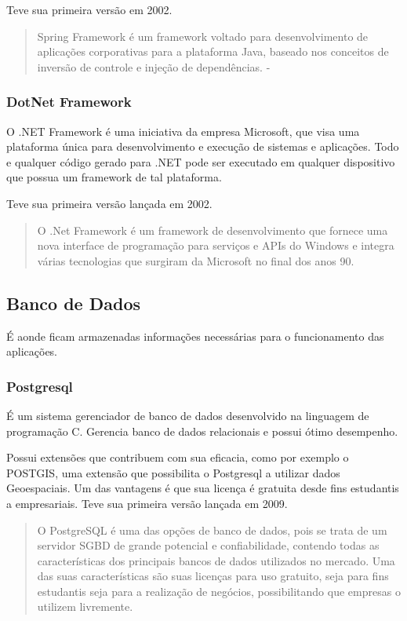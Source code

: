 Teve sua primeira versão em 2002.

\begin{quote}
  Spring Framework é um framework voltado para desenvolvimento de aplicações corporativas para a plataforma Java, baseado nos conceitos de inversão de controle e injeção de dependências. - \cite{weissmann2014vire}
\end{quote}

\subsubsection{DotNet Framework}

O .NET Framework é uma iniciativa da empresa Microsoft, que visa uma plataforma única para desenvolvimento e execução de sistemas e aplicações.
Todo e qualquer código gerado para .NET pode ser executado em qualquer dispositivo que possua um framework de tal plataforma.

Teve sua primeira versão lançada em 2002.

\begin{quote}
  
O .Net Framework é um framework de desenvolvimento que fornece uma nova interface de programação para serviços e APIs do Windows e integra várias tecnologias que surgiram da Microsoft no final dos anos 90. \cite{thai2003net}
\end{quote}

\subsection{Banco de Dados}

É aonde ficam armazenadas informações necessárias para o funcionamento das aplicações.

\subsubsection{Postgresql}

É um sistema gerenciador de banco de dados desenvolvido na linguagem de programação C.
Gerencia banco de dados relacionais e possui ótimo desempenho.

Possui extensões que contribuem com sua eficacia, como por exemplo o POSTGIS, uma extensão que possibilita o Postgresql a utilizar dados Geoespaciais.
Um das vantagens é que sua licença é gratuita desde fins estudantis a empresariais.
Teve sua primeira versão lançada em 2009.

\begin{quote}
  O PostgreSQL é uma das opções de banco de dados, pois se trata de um servidor SGBD de grande potencial e confiabilidade, contendo todas as características dos principais bancos de dados utilizados no mercado. Uma das suas características são suas licenças para uso gratuito, seja para fins estudantis seja para a realização de negócios, possibilitando que empresas o utilizem livremente. \cite{postgres}
\end{quote}
